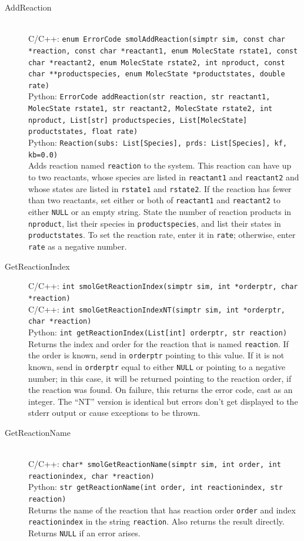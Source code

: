 \documentclass {scrbook}
\newcommand {\ttt} {\texttt}
\begin{document}
\begin{description}

\item[AddReaction]
\hfill \\
C/C++: \ttt{enum ErrorCode smolAddReaction(simptr sim, const char *reaction, const char *reactant1, enum MolecState rstate1, const char *reactant2, enum MolecState rstate2, int nproduct, const char **productspecies, enum MolecState *productstates, double rate)}\\
Python: \ttt{ErrorCode addReaction(str reaction, str reactant1, MolecState rstate1, str reactant2, MolecState rstate2, int nproduct, List[str] productspecies, List[MolecState] productstates, float rate)}\\
Python: \ttt{Reaction(subs: List[Species], prds: List[Species], kf, kb=0.0)}\\
Adds reaction named \ttt{reaction} to the system. This reaction can have up to two reactants, whose species are listed in \ttt{reactant1} and \ttt{reactant2} and whose states are listed in \ttt{rstate1} and \ttt{rstate2}. If the reaction has fewer than two reactants, set either or both of \ttt{reactant1} and \ttt{reactant2} to either \ttt{NULL} or an empty string. State the number of reaction products in \ttt{nproduct}, list their species in \ttt{productspecies}, and list their states in \ttt{productstates}. To set the reaction rate, enter it in \ttt{rate}; otherwise, enter \ttt{rate} as a negative number.

\item[GetReactionIndex]
C/C++: \ttt{int smolGetReactionIndex(simptr sim, int *orderptr, char *reaction)}\\
C/C++: \ttt{int smolGetReactionIndexNT(simptr sim, int *orderptr, char *reaction)}\\
Python: \ttt{int getReactionIndex(List[int] orderptr, str reaction)}\\
Returns the index and order for the reaction that is named \ttt{reaction}. If the order is known, send in \ttt{orderptr} pointing to this value. If it is not known, send in \ttt{orderptr} equal to either \ttt{NULL} or pointing to a negative number; in this case, it will be returned pointing to the reaction order, if the reaction was found. On failure, this returns the error code, cast as an integer. The ``NT'' version is identical but errors don't get displayed to the stderr output or cause exceptions to be thrown.

\item[GetReactionName]
\hfill \\
C/C++: \ttt{char* smolGetReactionName(simptr sim, int order, int reactionindex, char *reaction)}\\
Python: \ttt{str getReactionName(int order, int reactionindex, str reaction)}\\
Returns the name of the reaction that has reaction order \ttt{order} and index \ttt{reactionindex} in the string \ttt{reaction}. Also returns the result directly. Returns \ttt{NULL} if an error arises.


\end{description}
\end{document}
